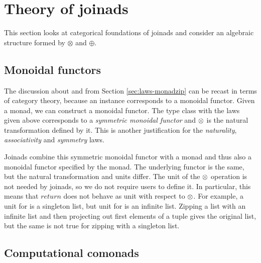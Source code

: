 \documentclass{sigplanconf}
\newcommand{\Varid}[1]{\mathit{#1}}
\begin{document}

\section{Theory of joinads}
\label{sec:theory}

This section looks at categorical foundations of joinads and consider an algebraic structure
formed by \ensuremath{\otimes} and \ensuremath{\oplus}.


\subsection{Monoidal functors}
\label{sec:theory-monoidal}

The discussion about  and  from Section \ref{sec:laws-monadzip}
can be recast in terms of category theory, because an  instance corresponds to a 
monoidal functor. Given a monad, we can construct a monoidal functor. The 
 type class with the laws given above corresponds to a \textit{symmetric monoidal 
functor} and $\otimes$ is the natural transformation defined by it. This is another justification for 
the \textit{naturality}, \textit{associativity} and \textit{symmetry} laws. 

Joinads combine this symmetric monoidal functor with a monad and thus also a monoidal functor 
specified by the monad. The underlying functor is the same, but the natural transformation and units 
differ. The unit of the $\otimes$ operation is not needed by joinads, so we do not require users to 
define it. In particular, this means that \ensuremath{\Varid{return}} does not behave as unit with respect to $\otimes$. 
For example, a unit for  is a singleton list, but unit for  is an infinite
list. Zipping a list with an infinite list and then projecting out first elements of a tuple
gives the original list, but the same is not true for zipping with a singleton list.


\subsection{Computational comonads}
\label{sec:theory-comonads}
\end{document}
